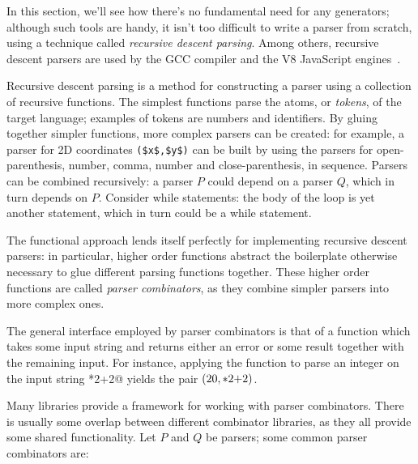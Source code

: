 \documentclass[UdineBachThesis,american,11pt]{PhdThesis}
\begin{document}
  In this section, we'll see how there's no fundamental need for any generators;
  although such tools are handy, it isn't too difficult to write a parser from
  scratch, using a technique called \emph{recursive descent parsing}. Among
  others, recursive descent parsers are used by the GCC compiler and the V8
  JavaScript engines~\cite{recursive-descent-parsing}.

  Recursive descent parsing is a method for constructing a parser using a
  collection of recursive functions. The simplest functions parse the atoms, or
  \emph{tokens}, of the target language; examples of tokens are numbers and
  identifiers. By gluing together simpler functions, more complex parsers can be
  created: for example, a parser for 2D coordinates
  \lstinline[mathescape]@($x$,$y$)@ can be built by using the parsers for
  open-parenthesis, number, comma, number and close-parenthesis, in sequence.
  Parsers can be combined recursively: a parser $P$ could depend on a parser
  $Q$, which in turn depends on $P$\@. Consider while statements: the body of
  the loop is yet another statement, which in turn could be a while statement.

  The functional approach lends itself perfectly for implementing recursive
  descent parsers: in particular, higher order functions abstract the
  boilerplate otherwise necessary to glue different parsing functions together.
  These higher order functions are called \emph{parser combinators}, as they
  combine simpler parsers into more complex ones.

  The general interface employed by parser combinators is that of a function
  which takes some input string and returns either an error or some result
  together with the remaining input. For instance, applying the function to
  parse an integer on the input string *2+2@ yields the pair
  $\left(20, \text{\lstinline@*2+2@}\right)$.

  Many libraries provide a framework for working with parser combinators. There
  is usually some overlap between different combinator libraries, as they all
  provide some shared functionality. Let $P$ and $Q$ be parsers; some common
  parser combinators are:
\end{document}
